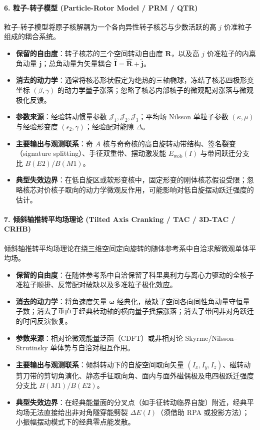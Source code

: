 \paragraph{6. 粒子-转子模型 (Particle-Rotor Model / PRM / QTR)}
粒子-转子模型将原子核解耦为一个各向异性转子核芯与少数活跃的高 $j$ 价准粒子组成的耦合系统。\cite{book-bohr-mottelson-nuclear-structure-vol2,meyer-ter-vehn-1975-triaxial-rotor-particle-model,frauendorf-2014-transverse-wobbling}
\begin{itemize}
\item \textbf{保留的自由度}：转子核芯的三个空间转动自由度 $\mathbf{R}$，以及高 $j$ 价准粒子的内禀角动量 $\mathbf{j}$；总角动量为矢量耦合 $\hat{\mathbf{I}} = \hat{\mathbf{R}} + \hat{\mathbf{j}}$。
\item \textbf{消去的动力学}：通常将核芯形状假定为绝热的三轴椭球，冻结了核芯四极形变坐标 $(\beta, \gamma)$ 的动力学量子涨落；忽略了核芯内部核子的微观配对涨落与微观极化反馈。
\item \textbf{参数来源}：经验转动惯量参数 $\mathcal{J}_1, \mathcal{J}_2, \mathcal{J}_3$；平均场 Nilsson 单粒子参数 $(\kappa, \mu)$ 与经验形变度 $(\epsilon_2, \gamma)$；经验配对能隙 $\Delta$。
\item \textbf{主要输出与观测联系}：奇 $A$ 核与奇奇核的高自旋转动带结构、签名裂变（signature splitting）、手征双重带、摆动激发能 $E_{\mathrm{wob}}(I)$ 与带间跃迁分支比 $B(E2)/\allowbreak B(M1)$。
\item \textbf{典型失效边界}：在低自旋区或软形变核中，固定形变的刚体核芯假设受限；忽略核芯对价核子取向的动力学微观反作用，可能影响对低自旋摆动跃迁强度的估计。\cite{nomura-2022-questioning-wobbling-ibfm}
\end{itemize}

\paragraph{7. 倾斜轴推转平均场理论 (Tilted Axis Cranking / TAC / 3D-TAC / CRHB)}
倾斜轴推转平均场理论在绕三维空间定向旋转的随体参考系中自洽求解微观单体平均场。\cite{frauendorf-2001-spontaneous-symmetry-breaking-rotating-nuclei,frauendorf-meng-1997-tilted-rotation-chirality}
\begin{itemize}
\item \textbf{保留的自由度}：在随体参考系中自洽保留了科里奥利力与离心力驱动的全核子准粒子顺排、反常配对破缺以及多准粒子极化效应。
\item \textbf{消去的动力学}：将角速度矢量 $\boldsymbol{\omega}$ 经典化，破缺了空间各向同性角动量守恒量子数；消去了垂直于经典转动轴的横向量子摇摆涨落；消去了带间非对角跃迁的时间反演恢复。
\item \textbf{参数来源}：相对论微观能量泛函（CDFT）或非相对论 Skyrme/Nilsson--Strutinsky 单体势与自洽对相互作用。
\item \textbf{主要输出与观测联系}：倾斜转动下的自旋空间取向矢量 $(I_x, I_y, I_z)$、磁转动剪刀带的剪切角演化、静态手征取向角、面内与面外磁偶极及电四极跃迁强度分支比 $B(M1)/B(E2)$。
\item \textbf{典型失效边界}：在经典能量面的分叉点（如手征转动临界自旋）附近，经典平均场无法直接给出非对角隧穿能劈裂 $\Delta E(I)$（须借助 RPA 或投影方法）；小振幅摆动模式下的经典零点能发散。
\end{itemize}

